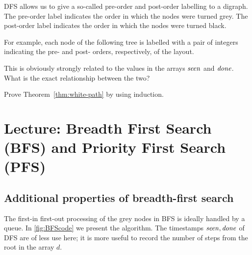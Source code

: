 \begin{Exercise}
\label{ex:DFS-prepostorder}
DFS allows us to give a so-called pre-order and post-order labelling to
a digraph. The pre-order label indicates the order in which the nodes
were turned grey. The post-order label indicates the order in which the
nodes were turned black.

For example, each node of the following tree is labelled with a pair of
integers indicating the pre- and post- orders, respectively, of the
layout.

\smallskip

\centerline{}

This is obviously strongly related to the values in the arrays $\operatorname{\text{\textit{seen}}}$ and 
$\operatorname{\text{\textit{done}}}$. What is the exact relationship between the two?
\end{Exercise}

\begin{Exercise}\label{ex:white-path}
Prove Theorem~\ref{thm:white-path} by using induction.
\end{Exercise}


\chapter{Lecture: Breadth First Search (BFS) and Priority First Search (PFS)}

\section{Additional properties of breadth-first search}
\label{sec:bfs}

The first-in first-out processing of the grey nodes in BFS is ideally
handled by a queue. In \cref{fig:BFScode} we present the algorithm.
The timestamps $\operatorname{\text{\textit{seen}}}, \operatorname{\text{\textit{done}}}$ of DFS are of less use here;
it is more useful to record the number of steps from the root in the
array $d$.


